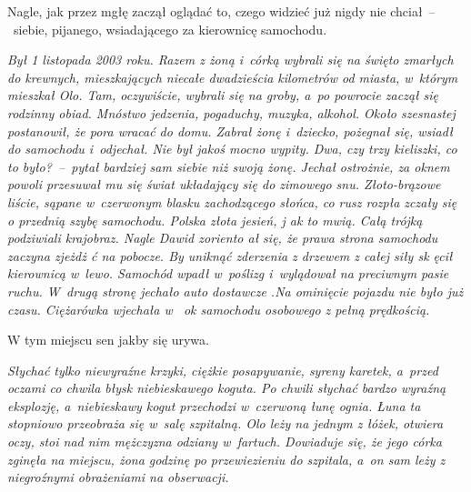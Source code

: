 \documentclass[../MAIN.tex]{subfiles}
\begin{document}
Nagle, jak przez mgłę zaczął oglądać to, czego widzieć już
nigdy nie chciał~--~siebie, pijanego, wsiadającego za
kierownicę samochodu.

\textsl{Był 1 listopada 2003 roku. Razem z żoną i~córką wybrali
się na święto zmarłych do krewnych, mieszkających niecałe
dwadzieścia kilometrów od miasta, w~którym mieszkał Olo. Tam,
oczywiście, wybrali się na groby, a~po powrocie zaczął się
rodzinny obiad. Mnóstwo jedzenia, pogaduchy, muzyka, alkohol.
Około szesnastej postanowił, że pora wracać do domu. Zabrał
żonę i~dziecko, pożegnał się, wsiadł do samochodu i~odjechał.
Nie był jakoś mocno wypity.
\sd
\xx Dwa, czy trzy kieliszki, co to było?~--~pytał bardziej sam siebie niż swoją żonę.
\qm
Jechał ostrożnie, za oknem powoli przesuwał mu się świat
układający się do zimowego snu. Złoto-brązowe liście, sąpane
w~czerwonym blasku zachodzącego słońca, co rusz rozpła  zczały
się o przednią szybę samochodu. Polska złota jesień, j ak to
mwią. Całą trójką podziwiali krajobraz. Nagle Dawid zoriento ał
się, że prawa strona samochodu zaczyna zjeżdż     ć na pobocze.
By uniknąć zderzenia z drzewem z całej siły sk   ęcił
kierownicą w~lewo. Samochód wpadł w~poślizg i~wylądował  na
preciwnym pasie ruchu. W~drugą stronę jechało auto dostawcze
.Na ominięcie pojazdu nie było już czasu. Ciężarówka wjechała w
~ok samochodu osobowego z pełną prędkością.}

W tym miejscu sen jakby się urywa.

\textsl{Słychać tylko
niewyraźne krzyki, ciężkie posapywanie, syreny karetek, a~przed
oczami co chwila błysk niebieskawego koguta. Po chwili słychać
bardzo wyraźną eksplozję, a~niebieskawy kogut przechodzi
w~czerwoną łunę ognia. Łuna ta stopniowo przeobraża się w~salę
szpitalną. Olo leży na jednym z łóżek, otwiera oczy, stoi nad
nim mężczyzna odziany w~fartuch. Dowiaduje się, że jego córka
zginęła na miejscu, żona godzinę po przewiezieniu do szpitala,
a~on sam leży z niegroźnymi obrażeniami na obserwacji.}
\end{document}
